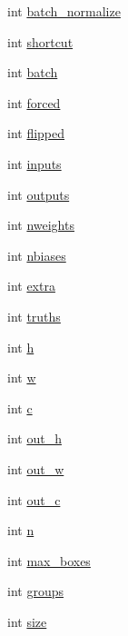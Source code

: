 \begin{DoxyCompactItemize}
\item 
int \mbox{\hyperlink{structlayer_a9af00a1fb4729a6ecdc62df42f4d3ae3}{batch\+\_\+normalize}}
\item 
int \mbox{\hyperlink{structlayer_a84b1f1077ca914dafadb8e82bb12d46d}{shortcut}}
\item 
int \mbox{\hyperlink{structlayer_aff6bd99e74d13cccca4c492dd3e8de9c}{batch}}
\item 
int \mbox{\hyperlink{structlayer_acf386a1f7b93955cc5d04513bb4e4649}{forced}}
\item 
int \mbox{\hyperlink{structlayer_a44bd658c46a69f7863d781eb731475b0}{flipped}}
\item 
int \mbox{\hyperlink{structlayer_a3fac583bf31e18ca679d195b1485b316}{inputs}}
\item 
int \mbox{\hyperlink{structlayer_a0874fab782ae0e8f1075cc99d776478b}{outputs}}
\item 
int \mbox{\hyperlink{structlayer_a76a23567dbc4b223d8ba3c34c0f5e82f}{nweights}}
\item 
int \mbox{\hyperlink{structlayer_a8da8330f6a80f7fcb86fb2421c0484e5}{nbiases}}
\item 
int \mbox{\hyperlink{structlayer_aaaa32102948bc9d4d4a506cf258b9910}{extra}}
\item 
int \mbox{\hyperlink{structlayer_a086d4ebdf69d011ef4c11a487bd5ff60}{truths}}
\item 
int \mbox{\hyperlink{structlayer_a7766d090f7dac8294b7456c1251ab485}{h}}
\item 
int \mbox{\hyperlink{structlayer_a2e00450d79170c48791a1ed5a6f1d0c4}{w}}
\item 
int \mbox{\hyperlink{structlayer_a6d10d2818541049ff11e94b257077a2d}{c}}
\item 
int \mbox{\hyperlink{structlayer_a8f8224d0915a9903d93874aefe278f98}{out\+\_\+h}}
\item 
int \mbox{\hyperlink{structlayer_a46454d978f2d84f8b8aba918a747c761}{out\+\_\+w}}
\item 
int \mbox{\hyperlink{structlayer_a298d150dabc449824204579f4851b926}{out\+\_\+c}}
\item 
int \mbox{\hyperlink{structlayer_a454b8980d0186eb0095a25aadef41744}{n}}
\item 
int \mbox{\hyperlink{structlayer_a97f045f2c42981c7d1b9e47b8c69788f}{max\+\_\+boxes}}
\item 
int \mbox{\hyperlink{structlayer_a2a7404991ccfcc0b7b884a7638d078ff}{groups}}
\item 
int \mbox{\hyperlink{structlayer_a4168fc846264723c6149d4e464097a00}{size}}

\end{DoxyCompactItemize}
